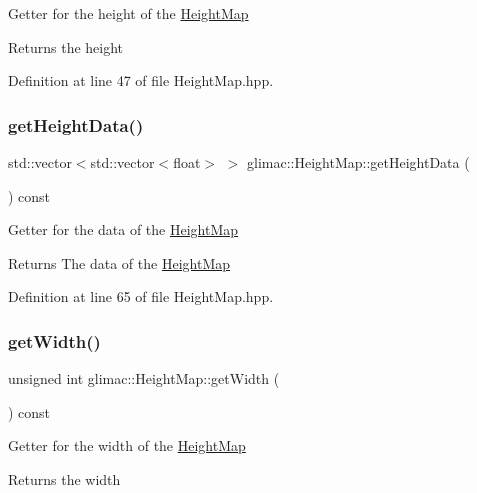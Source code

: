 Getter for the height of the \hyperlink{classglimac_1_1_height_map}{Height\+Map} \begin{DoxyReturn}{Returns}
the height 
\end{DoxyReturn}


Definition at line 47 of file Height\+Map.\+hpp.

\mbox{\label{classglimac_1_1_height_map_a5b4bb1e8f62b95d8058c307dddcdd412}} 
\subsubsection{\texorpdfstring{get\+Height\+Data()}{getHeightData()}}
{\footnotesize\ttfamily std\+::vector$<$std\+::vector$<$float$>$ $>$ glimac\+::\+Height\+Map\+::get\+Height\+Data (\begin{DoxyParamCaption}{ }\end{DoxyParamCaption}) const\hspace{0.3cm}{\ttfamily [inline]}}

Getter for the data of the \hyperlink{classglimac_1_1_height_map}{Height\+Map} \begin{DoxyReturn}{Returns}
The data of the \hyperlink{classglimac_1_1_height_map}{Height\+Map} 
\end{DoxyReturn}


Definition at line 65 of file Height\+Map.\+hpp.

\mbox{\label{classglimac_1_1_height_map_ab1e48683d69d8babea763adff3d02d10}} 
\subsubsection{\texorpdfstring{get\+Width()}{getWidth()}}
{\footnotesize\ttfamily unsigned int glimac\+::\+Height\+Map\+::get\+Width (\begin{DoxyParamCaption}{ }\end{DoxyParamCaption}) const\hspace{0.3cm}{\ttfamily [inline]}}

Getter for the width of the \hyperlink{classglimac_1_1_height_map}{Height\+Map} \begin{DoxyReturn}{Returns}
the width 
\end{DoxyReturn}


